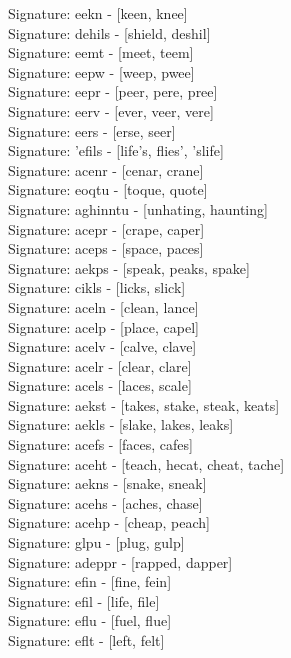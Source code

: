 Signature: {eekn} - [keen, knee] \\
Signature: {dehils} - [shield, deshil] \\
Signature: {eemt} - [meet, teem] \\
Signature: {eepw} - [weep, pwee] \\
Signature: {eepr} - [peer, pere, pree] \\
Signature: {eerv} - [ever, veer, vere] \\
Signature: {eers} - [erse, seer] \\
Signature: {'efils} - [life's, flies', 'slife] \\
Signature: {acenr} - [cenar, crane] \\
Signature: {eoqtu} - [toque, quote] \\
Signature: {aghinntu} - [unhating, haunting] \\
Signature: {acepr} - [crape, caper] \\
Signature: {aceps} - [space, paces] \\
Signature: {aekps} - [speak, peaks, spake] \\
Signature: {cikls} - [licks, slick] \\
Signature: {aceln} - [clean, lance] \\
Signature: {acelp} - [place, capel] \\
Signature: {acelv} - [calve, clave] \\
Signature: {acelr} - [clear, clare] \\
Signature: {acels} - [laces, scale] \\
Signature: {aekst} - [takes, stake, steak, keats] \\
Signature: {aekls} - [slake, lakes, leaks] \\
Signature: {acefs} - [faces, cafes] \\
Signature: {aceht} - [teach, hecat, cheat, tache] \\
Signature: {aekns} - [snake, sneak] \\
Signature: {acehs} - [aches, chase] \\
Signature: {acehp} - [cheap, peach] \\
Signature: {glpu} - [plug, gulp] \\
Signature: {adeppr} - [rapped, dapper] \\
Signature: {efin} - [fine, fein] \\
Signature: {efil} - [life, file] \\
Signature: {eflu} - [fuel, flue] \\
Signature: {eflt} - [left, felt] \\
